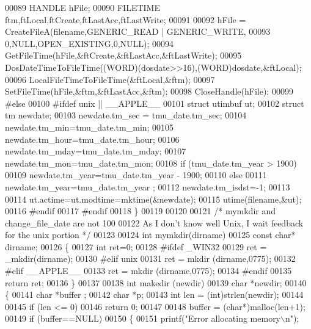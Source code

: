 \begin{DoxyCode}
00089   HANDLE hFile;
00090   FILETIME ftm,ftLocal,ftCreate,ftLastAcc,ftLastWrite;
00091 
00092   hFile = CreateFileA(filename,GENERIC\_READ | GENERIC\_WRITE,
00093                       0,NULL,OPEN\_EXISTING,0,NULL);
00094   GetFileTime(hFile,&ftCreate,&ftLastAcc,&ftLastWrite);
00095   DosDateTimeToFileTime((WORD)(dosdate>>16),(WORD)dosdate,&ftLocal);
00096   LocalFileTimeToFileTime(&ftLocal,&ftm);
00097   SetFileTime(hFile,&ftm,&ftLastAcc,&ftm);
00098   CloseHandle(hFile);
00099 \textcolor{preprocessor}{#else}
00100 \textcolor{preprocessor}{#ifdef unix || \_\_APPLE\_\_}
00101   \textcolor{keyword}{struct }utimbuf ut;
00102   \textcolor{keyword}{struct }tm newdate;
00103   newdate.tm\_sec = tmu\_date.tm\_sec;
00104   newdate.tm\_min=tmu\_date.tm\_min;
00105   newdate.tm\_hour=tmu\_date.tm\_hour;
00106   newdate.tm\_mday=tmu\_date.tm\_mday;
00107   newdate.tm\_mon=tmu\_date.tm\_mon;
00108   \textcolor{keywordflow}{if} (tmu\_date.tm\_year > 1900)
00109       newdate.tm\_year=tmu\_date.tm\_year - 1900;
00110   \textcolor{keywordflow}{else}
00111       newdate.tm\_year=tmu\_date.tm\_year ;
00112   newdate.tm\_isdst=-1;
00113 
00114   ut.actime=ut.modtime=mktime(&newdate);
00115   utime(filename,&ut);
00116 \textcolor{preprocessor}{#endif}
00117 \textcolor{preprocessor}{#endif}
00118 \}
00119 
00120 
00121 \textcolor{comment}{/* mymkdir and change\_file\_date are not 100 %
00122 \textcolor{comment}{   As I don't know well Unix, I wait feedback for the unix portion */}
00123 
00124 \textcolor{keywordtype}{int} mymkdir(dirname)
00125     \textcolor{keyword}{const} \textcolor{keywordtype}{char}* dirname;
00126 \{
00127     \textcolor{keywordtype}{int} ret=0;
00128 \textcolor{preprocessor}{#ifdef \_WIN32}
00129     ret = \_mkdir(dirname);
00130 \textcolor{preprocessor}{#elif unix}
00131     ret = mkdir (dirname,0775);
00132 \textcolor{preprocessor}{#elif \_\_APPLE\_\_}
00133     ret = mkdir (dirname,0775);
00134 \textcolor{preprocessor}{#endif}
00135     \textcolor{keywordflow}{return} ret;
00136 \}
00137 
00138 \textcolor{keywordtype}{int} makedir (newdir)
00139     \textcolor{keywordtype}{char} *newdir;
00140 \{
00141   \textcolor{keywordtype}{char} *buffer ;
00142   \textcolor{keywordtype}{char} *p;
00143   \textcolor{keywordtype}{int}  len = (int)strlen(newdir);
00144 
00145   \textcolor{keywordflow}{if} (len <= 0)
00146     \textcolor{keywordflow}{return} 0;
00147 
00148   buffer = (\textcolor{keywordtype}{char}*)malloc(len+1);
00149         \textcolor{keywordflow}{if} (buffer==NULL)
00150         \{
00151                 printf(\textcolor{stringliteral}{"Error allocating memory\(\backslash\)n"});
}
\end{DoxyCode}
